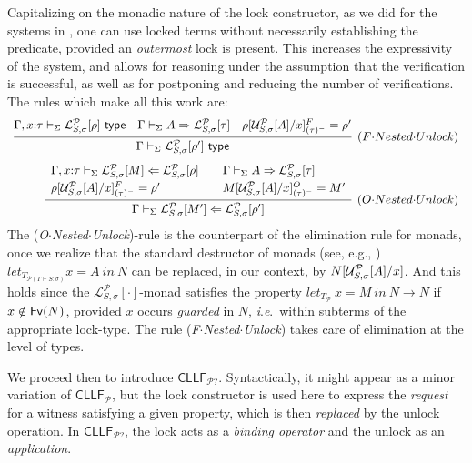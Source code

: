 \documentclass[submission,copyright,creativecommons]{eptcs}
\theoremstyle{plain}
\theoremstyle{definition}
\newcommand{\CLLFP} {\mbox{$\mathsf{CLLF}_{\mathcal P}$}}
\newcommand{\CLLFPQ} {\mbox{$\mathsf{CLLF}_{\mathcal P?}$}}
\newcommand {\ie}        {{\textit{i}.\textit{e}.}}
\newcommand {\Lock}   [4] {{\mathcal{L}}^{#1}_{#2, #3}[{#4}]} \newcommand {\LockC} [3] {{\mathcal{L}}^{#1}_{#2}      [{#3}]}
\newcommand {\VDASH}  {\vdash}
\newcommand {\VDASHS} {\vdash_\Sigma} \newcommand {\VDASHO} {\vdash_\Omega} \newcommand {\VDASHCBV} {\vdash_{\Sigma_{{CBV}}}} \newcommand {\VDASHSIMP} {\vdash_{\Sigma_{{Imp}}}} \newcommand {\VDASHSHOARE} {\vdash_{\Sigma_{{Hoare}}}} \newcommand {\VDASHSERASE} {\vdash_{\Sigma^\Erase}}    \newcommand {\VDASHEAL} {\vdash_{EAL}} \newcommand {\VDASHSEAL} {\vdash_{\Sigma_{{EAL}}}} \newcommand {\VDASHFP} {\vdash_{\sf FPST}}
\renewcommand {\P} {\mathcal{P}} \newcommand {\Q} {\mathcal{Q}}
\renewcommand {\L} {\mathcal{L}} \newcommand   {\C} {\mathcal{C}} \newcommand   {\T} {\mathcal{T}} \newcommand   {\U} {\mathcal{U}}
\newcommand{\Erase} {{-\U\L}}
\begin{document}
\noindent Capitalizing on the monadic nature of the lock constructor,
as we did for the systems in \cite{llfp-mfcs2014,HLMS15}, one can
use locked terms without necessarily establishing the
predicate, provided an \emph{outermost} lock is present. 
This increases the expressivity of the system, and allows
for reasoning under the assumption that the verification is
successful, as well as for postponing and reducing the number of verifications.  The rules which make all this work are:
$$
\begin{array}{r}
\infer[(F{\cdot}Nested{\cdot}Unlock)] {\Gamma \VDASHS {\Lock {\P} {S}
    {\sigma} {\rho'}\ \Type}}
 {\Gamma, x\of\tau \VDASHS {\Lock \P {S}
     {\sigma} {\rho}}\  \Type & \Gamma
     \VDASHS{A}\Rightarrow{\Lock{\P}{S}{\sigma}{\tau}}& \rho[ \Unlock {\P} {S}
                                 {\sigma}{A}/x]_{(\tau)^-}^F= \rho'
}
\\[3mm]
\infer[(O{\cdot}Nested{\cdot}Unlock)] {\Gamma \VDASHS {\Lock
    {\P} {S} {\sigma} {M'}}\Leftarrow {\Lock {\P} {S} {\sigma}
    {\rho'}}} {\begin{array}{l@{\qquad}l} \Gamma, x\of\tau \VDASHS
                 \Lock \P {S} {\sigma} {M}\Leftarrow \Lock \P {S} {\sigma} {\rho} &
                 \Gamma \VDASHS {A} \Rightarrow {\Lock \P {S} {\sigma} {\tau}}\\[1mm]
                 \rho[ \Unlock {\P} {S} {\sigma}{A}/x]_{(\tau)^-}^F =
                 \rho' & M[ \Unlock {\P} {S}
                         {\sigma}{A}/x]_{(\tau)^-}^O = M'
               \end{array}}
\end{array}
$$
\noindent The (\emph{O$\cdot$Nested$\cdot$Unlock})-rule is the counterpart of
the elimination rule for monads, once we realize that the standard destructor of monads (see, e.g., \cite{Moggi-Computationallambda})
$let_{T_{{\mathcal P}(\Gamma \VDASH S : \sigma )}} x=A\ in \ N$ can be
replaced, in our context, by $ N[\Unlock{\P}{S}{\sigma}{A}/ x]$. And this holds since
the $\Lock{\P}{S}{\sigma}{\cdot}$-monad satisfies the property
$let_{T_\P}\ x=M\ in \ N\rightarrow N $ if $ x \notin {\mathsf {Fv}}(N)$,
provided $x$ occurs \emph{guarded} in $N$, \ie\ within subterms of the
appropriate lock-type.  The rule
(\emph{F$\cdot$Nested$\cdot$Unlock}) takes care of elimination at the
level of types.

We proceed then to introduce \CLLFPQ. Syntactically, it might appear
as a minor variation of \CLLFP, but the lock constructor is used here
to express the \emph{request} for a witness satisfying a given
property, which is then \emph{replaced} by the unlock operation. In
\CLLFPQ, the lock acts as a \emph{binding operator} and the unlock as an
\emph{application}.
\end{document}

